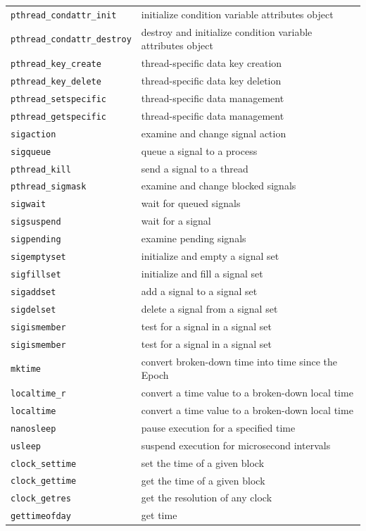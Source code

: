 \documentclass[a4paper,10pt,twoside]{report}
\begin{document}
\begin{longtable}{|l|l|}
\texttt{pthread\_condattr\_init} & initialize condition variable attributes object\\
\texttt{pthread\_condattr\_destroy} & destroy and initialize condition variable attributes object\\ \hline

\texttt{pthread\_key\_create} & thread-specific data key creation\\
\texttt{pthread\_key\_delete} & thread-specific data key deletion\\
\texttt{pthread\_setspecific} & thread-specific data management\\
\texttt{pthread\_getspecific} & thread-specific data management\\ \hline

\texttt{sigaction} & examine and change signal action\\
\texttt{sigqueue} & queue a signal to a process \\
\texttt{pthread\_kill} &  send a signal to a thread\\
\texttt{pthread\_sigmask} &  examine and change blocked signals \\
\texttt{sigwait} & wait for queued signals\\
\texttt{sigsuspend} & wait for a signal\\
\texttt{sigpending} &  examine pending signals\\ \hline

\texttt{sigemptyset} & initialize and empty a signal set \\
\texttt{sigfillset} &  initialize and fill a signal set \\
\texttt{sigaddset} & add a signal to a signal set\\
\texttt{sigdelset} & delete a signal from a signal set\\
\texttt{sigismember} & test for a signal in a signal set\\
\texttt{sigismember} & test for a signal in a signal set\\ \hline

\texttt{mktime} & convert broken-down time into time since the Epoch\\
\texttt{localtime\_r} &convert a time value to a broken-down local time \\
\texttt{localtime} & convert a time value to a broken-down local time\\
\texttt{nanosleep} & pause execution for a specified time
 \\
\texttt{usleep} & suspend execution for microsecond intervals\\
\texttt{clock\_settime} & set the time of a given block \\
\texttt{clock\_gettime} & get the time of a given block\\
\texttt{clock\_getres} & get the resolution of any clock \\
\texttt{gettimeofday} & get time\\ \hline


\end{longtable}
\end{document}
